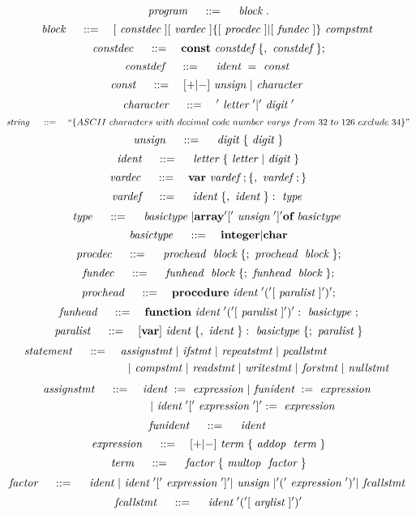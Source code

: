 \[
	~\emph{program}~ \quad ::= \quad 
		~\emph{block}~.
\]
\[
	~\emph{block}~ \quad ::= \quad 
		[~\emph{constdec}~] [~\emph{vardec}~] \{[~\emph{procdec}~] | [~\emph{fundec}~]\} ~\emph{compstmt}~
\]
\[
	~\emph{constdec}~ \quad ::= \quad
		\textbf{const} ~\emph{constdef}~ \{,~\emph{constdef}~\};	
\]
\[
	~\emph{constdef}~ \quad ::= \quad
		~\emph{ident}~ = ~\emph{const}~
\]
\[
	~\emph{const}~ \quad ::= \quad
		[+|-]~\emph{unsign}~|~\emph{character}~
\]
\[
	~\emph{character}~ \quad ::= \quad
		'~\emph{letter}~' | '~\emph{digit}~'
\]
\[
	~\emph{string}~ \quad ::= \quad
		``\{ASCII~characters~with~decimal~code~number~varys~from~32~to~126~exclude~34\}"
\]
\[
	~\emph{unsign}~ \quad ::= \quad
		~\emph{digit}~ \{~\emph{digit}~\}
\]
\[
	~\emph{ident}~ \quad ::= \quad
		~\emph{letter}~ \{ ~\emph{letter}~ | ~\emph{digit}~ \}
\]
\[
	~\emph{vardec}~ \quad ::= \quad
		\textbf{var} ~\emph{vardef}~; \{, ~\emph{vardef}~; \}
\]
\[
	~\emph{vardef}~ \quad ::= \quad
		~\emph{ident}~\{,~\emph{ident}~\}:~\emph{type}~
\]
\[
	~\emph{type}~ \quad ::= \quad
		~\emph{basictype}~ | \textbf{array} '['~\emph{unsign}~']' \textbf{of} ~\emph{basictype}~
\]
\[
	~\emph{basictype}~ \quad ::= \quad
		\textbf{integer} | \textbf{char}
\]
\[
	~\emph{procdec}~ \quad ::= \quad
		~\emph{prochead}~ ~\emph{block}~ \{; ~\emph{prochead}~ ~\emph{block}~ \};
\]
\[
	~\emph{fundec}~ \quad ::= \quad
		~\emph{funhead}~ ~\emph{block}~ \{; ~\emph{funhead}~ ~\emph{block}~ \};
\]
\[
	~\emph{prochead}~ \quad ::= \quad
		\textbf{procedure} ~\emph{ident}~ '(' [~\emph{paralist}~] ')';
\]
\[
	~\emph{funhead}~ \quad ::= \quad
		\textbf{function} ~\emph{ident}~ '(' [~\emph{paralist}~] ')': ~\emph{basictype}~;
\]
\[
	~\emph{paralist}~ \quad ::= \quad
		[ \textbf{var} ] ~\emph{ident}~ \{, ~\emph{ident}~ \}: ~\emph{basictype}~ \{; ~\emph{paralist}~ \}
\]
\[ \begin{aligned}
	~\emph{statement}~ \quad ::= \quad
		& ~\emph{assignstmt}~ | ~\emph{ifstmt}~ | ~\emph{repeatstmt}~ | ~\emph{pcallstmt}~ \\
		& \quad | ~\emph{compstmt}~ | ~\emph{readstmt}~ | ~\emph{writestmt}~ | ~\emph{forstmt}~ | ~\emph{nullstmt}~
\end{aligned} \]
\[ \begin{aligned}
	~\emph{assignstmt}~ \quad ::= \quad
		& ~\emph{ident}~ := ~\emph{expression}~ | ~\emph{funident}~ := ~\emph{expression}~  \\
		& \quad | ~\emph{ident}~ '[' ~\emph{expression}~ ']' := ~\emph{expression}~
\end{aligned} \]
\[
	~\emph{funident}~ \quad ::= \quad
		~\emph{ident}~
\]
\[
	~\emph{expression}~ \quad ::= \quad
		[+|-] ~\emph{term}~ \{ ~\emph{addop}~ ~\emph{term}~ \}
\]
\[
	~\emph{term}~ \quad ::= \quad
		~\emph{factor}~ \{ ~\emph{multop}~ ~\emph{factor}~ \}
\]
\[
	~\emph{factor}~ \quad ::= \quad
		~\emph{ident}~ | ~\emph{ident}~ '[' ~\emph{expression}~ ']' | ~\emph{unsign}~ |
			'(' ~\emph{expression}~ ')' | ~\emph{fcallstmt}~
\]
\[
	~\emph{fcallstmt}~ \quad ::= \quad
		~\emph{ident}~ '('[ ~\emph{arglist}~ ]')'
\]
